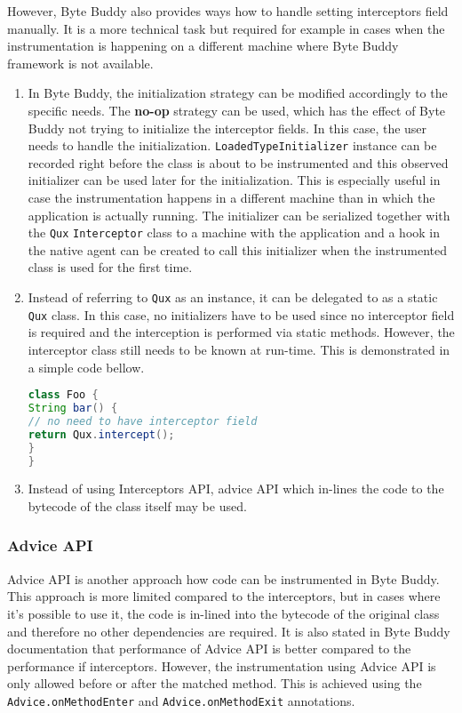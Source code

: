However, Byte Buddy also provides ways how to handle setting interceptors field manually. It is a more technical task but required for example in cases when the instrumentation is happening on a different machine where Byte Buddy framework is not available.
\begin{enumerate}
\item In Byte Buddy, the initialization strategy can be modified accordingly to the specific needs. The \textbf{no-op} strategy can be used, which has the effect of Byte Buddy not trying to initialize the interceptor fields. In this case, the user needs to handle the initialization. \texttt{LoadedTypeInitializer} instance can be recorded right before the class is about to be instrumented and this observed initializer can be used later for the initialization. This is especially useful in case the instrumentation happens in a different machine than in which the application is actually running. The initializer can be serialized together with the \texttt{Qux} \texttt{Interceptor} class to a machine with the application and a hook in the native agent can be created to call this initializer when the instrumented class is used for the first time.

\item Instead of referring to \texttt{Qux} as an instance, it can be delegated to as a static \texttt{Qux} class. In this case, no initializers have to be used since no interceptor field is required and the interception is performed via static methods. However, the interceptor class still needs to be known at run-time. This is demonstrated in a simple code bellow.

\begin{lstlisting}[language=Java]
class Foo {
String bar() {
// no need to have interceptor field
return Qux.intercept(); 
}
}
\end{lstlisting}

\item Instead of using Interceptors API, advice API which in-lines the code to the bytecode of the class itself may be used.
\end{enumerate}


\subsubsection{Advice API}
Advice API is another approach how code can be instrumented in Byte Buddy. This approach is more limited compared to the interceptors, but in cases where it's possible to use it, the code is in-lined into the bytecode of the original class and therefore no other dependencies are required. It is also stated in Byte Buddy documentation that performance of Advice API is better compared to the performance if interceptors.
However, the instrumentation using Advice API is only allowed before or after the matched method. This is achieved using the \texttt{Advice.onMethodEnter} and \texttt{Advice.onMethodExit} annotations. 

